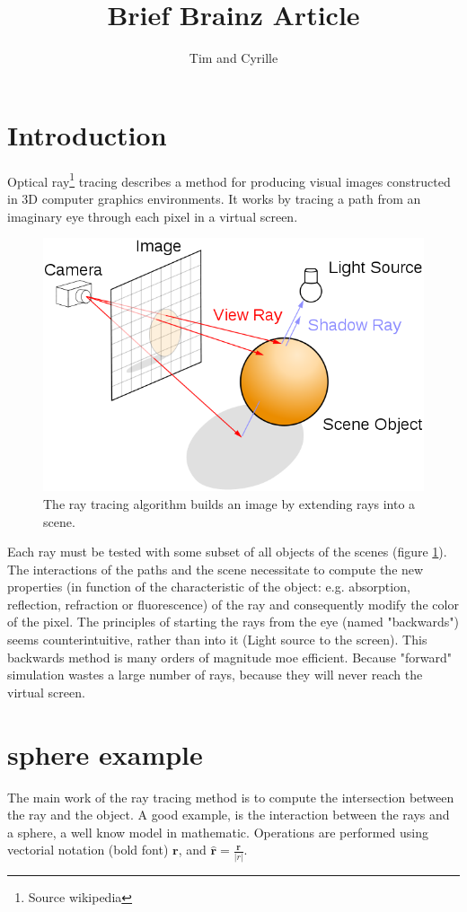 \documentclass[11pt]{amsart}
\title{Brief Brainz Article}
\author{Tim and Cyrille}
\begin{document}
\section{Introduction}
Optical ray\footnote{Source wikipedia} tracing describes a method for producing visual images constructed in 3D computer graphics environments. It works
by tracing a path from an imaginary eye through each pixel in a virtual screen. 

\begin{figure}[htbp]
\begin{center}
\includegraphics[scale=0.35]{640px-Ray_trace_diagram}
\caption{The ray tracing algorithm builds an image by extending rays into a scene. \label{fig1}}
\end{center}
\end{figure}

Each ray must be tested with some subset of all objects of the scenes (figure \ref{fig1}). The interactions of the paths and the scene necessitate to compute 
the new properties (in function of the characteristic of the object: e.g. absorption, reflection, refraction or fluorescence) of the ray and 
consequently modify the color of the pixel. The principles of starting the rays from the eye (named "backwards") seems counterintuitive, 
rather than into it (Light source to the screen). This backwards method is many orders of magnitude moe efficient. 
Because "forward" simulation wastes a large number of rays, because they will never reach the virtual screen.

\section{sphere example \label{SECTION_EX}}
The main work of the ray tracing method is to compute the intersection between the ray and the object. A good example, is the interaction 
between the rays and a sphere, a well know model in mathematic. Operations are performed using vectorial notation (bold font) $\mathbf{r}$,
and $\hat{\mathbf{r}} = \frac{\mathbf{r}}{|r|}$.
\end{document}

